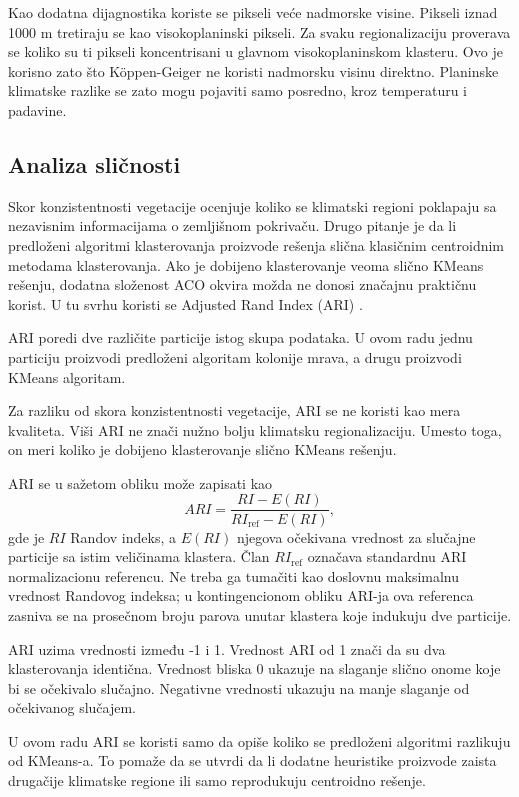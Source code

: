 \documentclass[11pt]{article}
\begin{document}
Kao dodatna dijagnostika koriste se pikseli veće nadmorske visine. Pikseli iznad 1000 m tretiraju se kao visokoplaninski pikseli. Za svaku regionalizaciju proverava se koliko su ti pikseli koncentrisani u glavnom visokoplaninskom klasteru. Ovo je korisno zato što Köppen-Geiger ne koristi nadmorsku visinu direktno. Planinske klimatske razlike se zato mogu pojaviti samo posredno, kroz temperaturu i padavine.

\subsection{Analiza sličnosti}
Skor konzistentnosti vegetacije ocenjuje koliko se klimatski regioni poklapaju sa nezavisnim informacijama o zemljišnom pokrivaču. Drugo pitanje je da li predloženi algoritmi klasterovanja proizvode rešenja slična klasičnim centroidnim metodama klasterovanja. Ako je dobijeno klasterovanje veoma slično KMeans rešenju, dodatna složenost ACO okvira možda ne donosi značajnu praktičnu korist. U tu svrhu koristi se Adjusted Rand Index (ARI) \cite{hubert1985}.

ARI poredi dve različite particije istog skupa podataka. U ovom radu jednu particiju proizvodi predloženi algoritam kolonije mrava, a drugu proizvodi KMeans algoritam.

Za razliku od skora konzistentnosti vegetacije, ARI se ne koristi kao mera kvaliteta. Viši ARI ne znači nužno bolju klimatsku regionalizaciju. Umesto toga, on meri koliko je dobijeno klasterovanje slično KMeans rešenju.

ARI se u sažetom obliku može zapisati kao
\[
ARI=
\frac{RI-E(RI)}
{RI_{\mathrm{ref}}-E(RI)},
\]
gde je $RI$ Randov indeks, a $E(RI)$ njegova očekivana vrednost za slučajne
particije sa istim veličinama klastera. Član $RI_{\mathrm{ref}}$ označava
standardnu ARI normalizacionu referencu. Ne treba ga tumačiti kao doslovnu
maksimalnu vrednost Randovog indeksa; u kontingencionom obliku ARI-ja ova
referenca zasniva se na prosečnom broju parova unutar klastera koje indukuju
dve particije.

ARI uzima vrednosti između -1 i 1. Vrednost ARI od 1 znači da su dva klasterovanja identična. Vrednost bliska 0 ukazuje na slaganje slično onome koje bi se očekivalo slučajno. Negativne vrednosti ukazuju na manje slaganje od očekivanog slučajem.

U ovom radu ARI se koristi samo da opiše koliko se predloženi algoritmi razlikuju od KMeans-a. To pomaže da se utvrdi da li dodatne heuristike proizvode zaista drugačije klimatske regione ili samo reprodukuju centroidno rešenje.
\end{document}
